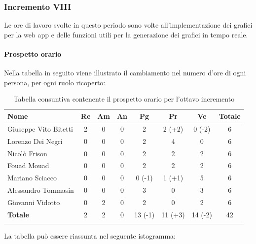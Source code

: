 		\subsubsection{Incremento VIII}
			Le ore di lavoro svolte in questo periodo sono volte all'implementazione dei grafici per la web app e delle funzioni utili per la generazione dei grafici in tempo reale.
		\paragraph{Prospetto orario}
			Nella tabella in seguito viene illustrato il cambiamento nel numero d'ore di ogni persona, per ogni ruolo ricoperto:
		
		\begin{longtable}{|l|c|c|c|c|c|c|c|}
			\hline
			\rowcolor{lighter-grayer}
			\textbf{Nome} & \textbf{Re} & \textbf{Am} & \textbf{An} & \textbf{Pg}  & \textbf{Pr}   & \textbf{Ve} & \textbf{Totale} \\
			\hline
			\endfirsthead
			
			\hline
			Giuseppe Vito Bitetti 		 & 2 & 0 & 0 & 2 & 2 (+2) & 0 (-2) & 6\\
			\hline
			\hline
			Lorenzo Dei Negri			 & 0 & 0 & 0 & 2 & 4 & 0 & 6\\
			\hline
			\hline
			Nicolò Frison				      & 0 & 0 & 0 & 2 & 2 & 2 & 6\\
			\hline
			\hline
			Fouad Mouad 				   & 0 & 0 & 0 & 2 & 2 & 2 & 6\\
			\hline
			\hline
			Mariano Sciacco 			 & 0 & 0 & 0 & 0 (-1) & 1 (+1) & 5 & 6\\
			\hline
			\hline
			Alessandro Tommasin    & 0 & 0 & 0 & 3 & 0 & 3 & 6\\
			\hline
			\hline
			Giovanni Vidotto 			  & 0 & 2 & 0 & 2 & 0 & 2 & 6\\
			\hline 
			\textbf{Totale}			 		 & 2 & 2 & 0 & 13 (-1) & 11 (+3) & 14 (-2) & 42\\
			\hline
			\caption{Tabella consuntiva contenente il prospetto orario per l'ottavo incremento}
		\end{longtable}
		
		La tabella può essere riassunta nel seguente istogramma:
		
